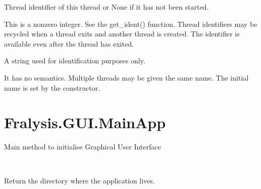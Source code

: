 \documentclass[letterpaper,10pt,english]{sphinxmanual}
\begin{document}

\begin{fulllineitems}
\label{\detokenize{index:Fralysis.GUI.InputOutputGui.ident}}
Thread identifier of this thread or None if it has not been started.

This is a nonzero integer. See the get\_ident() function. Thread
identifiers may be recycled when a thread exits and another thread is
created. The identifier is available even after the thread has exited.

\end{fulllineitems}


\begin{fulllineitems}
\label{\detokenize{index:Fralysis.GUI.InputOutputGui.name}}
A string used for identification purposes only.

It has no semantics. Multiple threads may be given the same name. The
initial name is set by the constructor.

\end{fulllineitems}



\chapter{Fralysis.GUI.MainApp}
\label{\detokenize{index:module-Fralysis.GUI.MainApp}}\label{\detokenize{index:fralysis-gui-mainapp}}
Main method to initialise Graphical User Interface

\begin{fulllineitems}
\label{\detokenize{index:Fralysis.GUI.MainApp.directory}}~

Return the directory where the application lives.

\end{fulllineitems}
\end{document}
